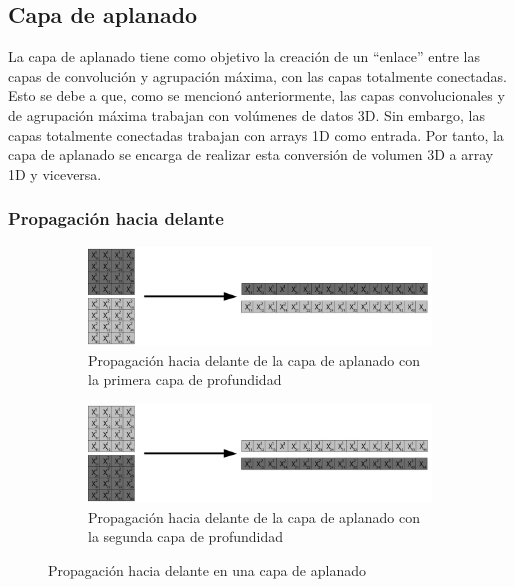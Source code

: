 \subsection{Capa de aplanado}

La capa de aplanado tiene como objetivo la creación de un ``enlace'' entre las capas de convolución y agrupación máxima, con las capas totalmente conectadas. Esto se debe a que, como se mencionó anteriormente, las capas convolucionales y de agrupación máxima trabajan con volúmenes de datos 3D. Sin embargo, las capas totalmente conectadas trabajan con arrays 1D como entrada. Por tanto, la capa de aplanado se encarga de realizar esta conversión de volumen 3D a array 1D y viceversa. 

\subsubsection{Propagación hacia delante}
\begin{figure}[H]
	\centering
	\begin{subfigure}{.5\textwidth}
		\hspace{-10mm}
		\includegraphics[width=2\linewidth]{imagenes/flatten_1.jpg}  
		\caption{Propagación hacia delante de la capa de aplanado con la primera capa de profundidad}
	\end{subfigure}
	\begin{subfigure}{.5\textwidth}
		\hspace{-10mm}
		\includegraphics[width=2\linewidth]{imagenes/flatten_2.jpg}  
		\caption{Propagación hacia delante de la capa de aplanado con la segunda capa de profundidad}
	\end{subfigure}
	
	\caption{Propagación hacia delante en una capa de aplanado}
	\label{fig:forward_prop_flatten_canales_profundidad}
\end{figure}

